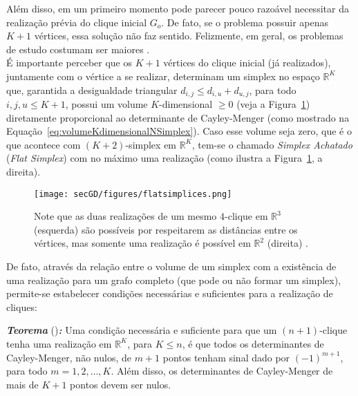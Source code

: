 Além disso, em um primeiro momento pode parecer pouco razoável necessitar da realização prévia do clique inicial $G_o$. De fato, se o problema possuir apenas $K+1$ vértices, essa solução não faz sentido. Felizmente, em geral, os problemas de estudo costumam ser maiores \cite{carlileGDandAplications}. 
\\

É importante perceber que os $K+1$ vértices do clique inicial (já realizados), juntamente com o vértice a se realizar, determinam um simplex no espaço $\mathbb{R}^K$ que, garantida a desigualdade triangular $d_{i,j} \leq d_{i,u} + d_{u,j}$, para todo $i,j,u \leq K+1$, possui um volume $K$-dimensional $\geq 0$ (veja a Figura~\ref{fig:flatsimplices}) diretamente proporcional ao determinante de Cayley-Menger (como mostrado na Equação~\ref{eq:volumeKdimensionalNSimplex}). Caso esse volume seja zero, que é o que acontece com $(K+2)$-simplex em $\mathbb{R}^K$, tem-se o chamado \textit{Simplex Achatado} (\textit{Flat Simplex}) com no máximo uma realização (como ilustra a Figura~\ref{fig:flatsimplices}, a direita).

\begin{figure}[H]
	\begin{center}
		\texttt{[image: secGD/figures/flatsimplices.png]}
	\end{center}
	\caption{Note que as duas realizações de um mesmo $4$-clique em $\mathbb{R}^3$ (esquerda) são possíveis por respeitarem as distâncias entre os vértices, mas somente uma realização é possível em $\mathbb{R}^{2}$ (direita) \cite{libertiEDG}.}
	\label{fig:flatsimplices}
\end{figure}

De fato, através da relação entre o volume de um simplex com a existência de uma realização para um grafo completo (que pode ou não formar um simplex), permite-se estabelecer condições necessárias e suficientes para a realização de cliques:

\begin{center}
	\begin{minipage}{0.93 \linewidth}
		\textbf{\textit{Teorema}} (\cite{correiaCondicoesNecessaESuficiDGPCayleyMenger})\textit{\textbf{:}} Uma condição necessária e suficiente para que um $(n+1)$-clique tenha uma realização em $\mathbb{R}^K$, para $K\leq n$, é que todos os determinantes de Cayley-Menger, não nulos, de $m+1$ pontos tenham sinal dado por $(-1)^{m+1}$, para todo $m=1,2,\dots,K$. Além disso, os determinantes de Cayley-Menger de mais de $K+1$ pontos devem ser nulos.
	\end{minipage}
\end{center}

